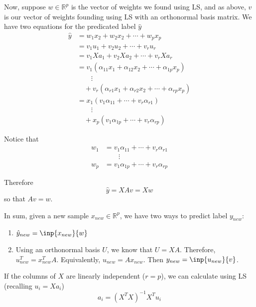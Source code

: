 \documentclass[12pt]{article}
\theoremstyle{definition}
\newcommand{\R}{\mathbb{R}}
\begin{document}
Now, suppose $w \in \R^p$ is the vector of weights we found using LS, and as above, $v$ is our vector of weights founding using LS with an orthonormal basis matrix. We have two equations for the predicated label $\hat y$
\begin{align*}
	\hat y &= w_1 x_2 + w_2 x_2 + \cdots + w_p x_p \\
		   &= v_1 u_1 + v_2 u_2 + \cdots + v_r u_r \\
		   &= v_1 X a_1 + v_2 X a_2 + \cdots + v_r X a_r \\
		   &= v_1 (\alpha_{11}x_1 + \alpha_{12}x_2 + \cdots + \alpha_{1p} x_p) \\
		   &\qquad \vdots \\
		   &\quad + v_r (\alpha_{r1}x_1 + \alpha_{r2}x_2 + \cdots + \alpha_{rp} x_p) \\
		   &= x_1 (v_1 \alpha_{11} + \cdots + v_r \alpha_{r1}) \\
		   &\qquad \vdots \\
		   &\quad + x_p (v_1 \alpha_{1p} + \cdots + v_r \alpha_{rp})
\end{align*}

Notice that 
\begin{align*}
w_1 &= v_1 \alpha_{11} + \cdots + v_r \alpha_{r1} \\
&\qquad \vdots \\
w_p &= v_1 \alpha_{1p} + \cdots + v_r \alpha_{rp}
\end{align*}

Therefore
\begin{equation}
	\hat y = XAv = Xw
\end{equation}
so that $Av = w$.

In sum, given a new sample $x_{new} \in \R^p$, we have two ways to predict label $y_{new}$:
\begin{enumerate}
	\item $\hat y_{new} = \inp{x_{new}}{w}$
	\item Using an orthonormal basis $U$, we know that $U = XA$. Therefore, $u_{new}^T = x_{new}^T A$. Equivalently, $u_{new} = A x_{new}$. Then $y_{new} = \inp{u_{new}}{v}$. 
\end{enumerate}

If the columns of $X$ are linearly independent ($r = p$), we can calculate using LS (recalling $u_i = X a_i$)
\begin{equation}
	a_i = (X^T X)^{-1} X^T u_i
\end{equation}
\end{document}
